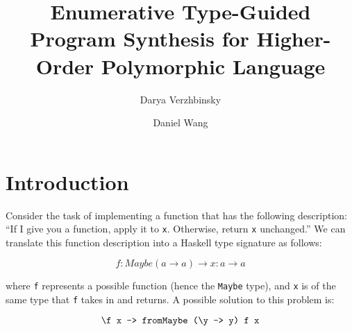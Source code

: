 \documentclass[acmsmall,nonacm]{acmart}
\begin{document}
\title{Enumerative Type-Guided Program Synthesis for Higher-Order Polymorphic Language} %

\author{Darya Verzhbinsky}

\author{Daniel Wang}

\maketitle

\section{Introduction}


Consider the task of implementing a function that has the following 
description: “If I give you a function, apply it to \verb|x|. Otherwise, 
return \verb|x| unchanged.” We can translate this function description 
into a Haskell type signature as follows: 

\begin{equation}
  \label{query1}
  f:Maybe (a \to a) \to x:a \to a
\end{equation}

\noindent where \verb|f| represents a possible function (hence the \verb|Maybe| type), and 
\verb|x| is of the same type that \verb|f| takes in and returns. A possible 
solution to this problem is:

\begin{equation}
  \label{solution1}
  \verb|\f x -> fromMaybe (\y -> y) f x|
\end{equation}
\end{document}
